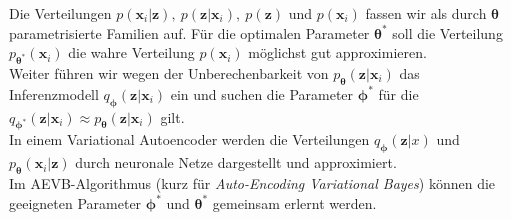\documentclass[12pt]{article}
\newcommand{\z}{\mathbf{z}}
\newcommand{\x}{\mathbf{x}_i}
\begin{document}
	Die Verteilungen $p(\x|\z),\ p(\z|\x),\ p(\z)$ und $p(\x)$ fassen wir als durch ${\boldsymbol\theta}$ parametrisierte Familien auf. Für die optimalen Parameter $\boldsymbol\theta^{*}$ soll die Verteilung  $p_{\boldsymbol\theta^{*}}(\x)$ die wahre Verteilung $p(\x)$ möglichst gut approximieren.\\
	Weiter führen wir wegen der Unberechenbarkeit von $p_{\boldsymbol\theta}(\z|\x)$ das Inferenzmodell $q_{\boldsymbol\phi}(\z|\x)$ ein und suchen die Parameter $\boldsymbol\phi^{*}$ für die $q_{\boldsymbol\phi^{*}}(\z|\x) \approx p_{\boldsymbol\theta}(\z|\x)$ gilt.\\
	In einem Variational Autoencoder werden die Verteilungen $q_{\boldsymbol\phi}(\z|x)$ und $p_{\boldsymbol\theta}(\x|\z)$ durch neuronale Netze dargestellt und approximiert.\\
	Im AEVB-Algorithmus (kurz für \emph{Auto-Encoding Variational Bayes}) können die geeigneten Parameter $\boldsymbol\phi^{*}$ und $\boldsymbol\theta^{*}$ gemeinsam erlernt werden.
\end{document}
